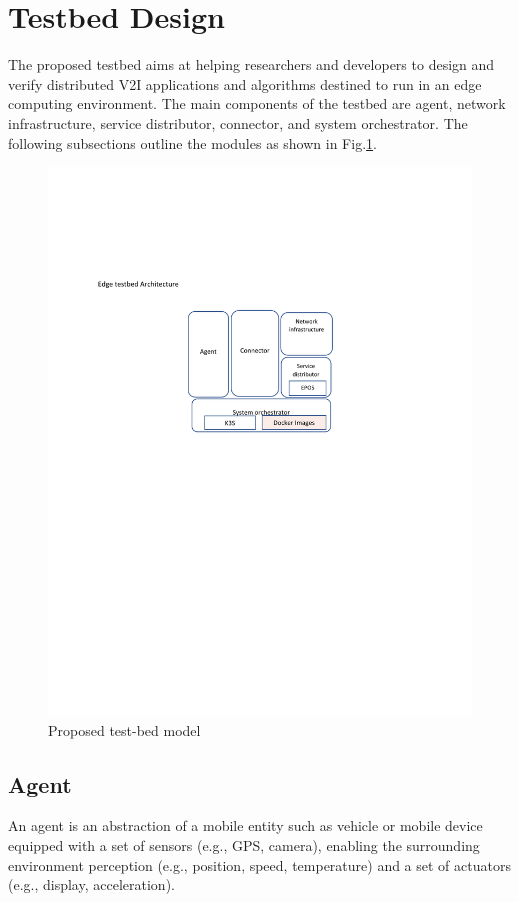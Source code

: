 \documentclass[conference]{IEEEtran}
\begin{document}
\section{Testbed Design}
\par The proposed testbed aims at helping researchers and developers to design and verify distributed
V2I applications and algorithms destined to run in an edge computing environment. 
The main components of the testbed are agent, network infrastructure, service distributor, connector, and system orchestrator. The following subsections outline the modules as shown in Fig.\ref{fig:model}.
\begin{figure}[!htbp]
\centering
\includegraphics[clip, trim=6cm 14.0cm 6.0cm 6.5cm, width=\columnwidth]{figures/model1.pdf}
\caption{Proposed test-bed model}
\label{fig:model}
\end{figure}

\subsection{Agent}
\par An agent is an abstraction of a mobile entity such as vehicle or mobile device equipped with a set of sensors (e.g., GPS, camera), enabling the surrounding environment perception (e.g., position, speed, temperature) and a set of actuators (e.g., display, acceleration). 
\end{document}
